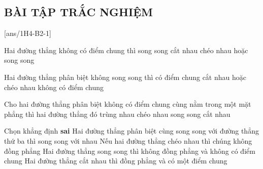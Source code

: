 \subsection{BÀI TẬP TRẮC NGHIỆM}
\TN
\setcounter{ex}{0}
[ans/1H4-B2-1]
\begin{ex}%
	Hai đường thẳng không có điểm chung thì
	{song song}
	{cắt nhau}
	{\True chéo nhau hoặc song song}
		\loigiai{}
\end{ex}

\begin{ex}%
	Hai đường thẳng phân biệt không song song thì
	{có điểm chung}
	{\True cắt nhau hoặc chéo nhau}
	{ không có điểm chung}
	\loigiai{}
\end{ex}

\begin{ex}%
	Cho hai đường thẳng phân biệt không có điểm chung cùng nằm trong một mặt phẳng thì hai đường thẳng đó
	\choice
	{trùng nhau}
	{chéo nhau}
	{\True song song}
	{cắt nhau}
\end{ex}

\begin{ex}%
	Chọn khẳng định {\bf sai}
	\choice
	{Hai đường thẳng phân biệt cùng song song với đường thẳng thứ ba thì song song với nhau}
	{Nếu hai đường thẳng chéo nhau thì chúng không đồng phẳng}
	{\True Hai đường thẳng song song thì không đồng phẳng và không có điểm chung}
	{Hai đường thẳng cắt nhau thì đồng phẳng và có một điểm chung}
\end{ex}


